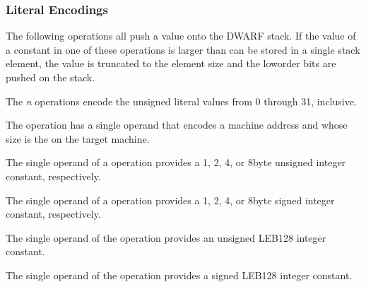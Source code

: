 \subsubsection{Literal Encodings}
\label{chap:literalencodings}
The 
following operations all push a value onto the DWARF
stack. 
If the value of a constant in one of these operations
is larger than can be stored in a single stack element, the
value is truncated to the element size and the low\dash order bits
are pushed on the stack.
\begin{enumerate}[1. ]
The \textit{n} operations encode the unsigned literal values
from 0 through 31, inclusive.

The  operation has a single operand that encodes
a machine address and whose size is the 
on the target machine.

The single operand of a  operation provides a 1,
2, 4, or 8\dash byte unsigned integer constant, respectively.

The single operand of a  operation provides a 1,
2, 4, or 8\dash byte signed integer constant, respectively.

The single operand of the  operation provides
an unsigned LEB128 integer constant.

The single operand of the  operation provides
a signed LEB128 integer constant.

\end{enumerate}


